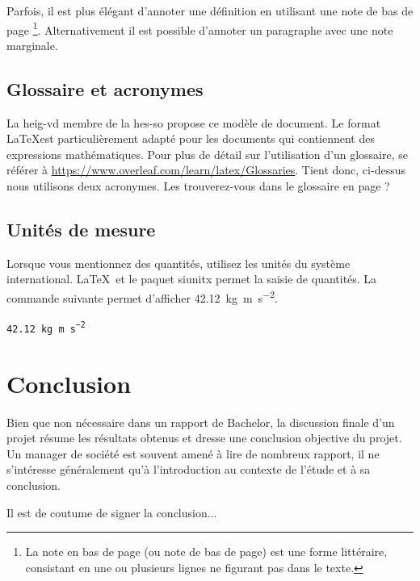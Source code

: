 \documentclass[
    iai, %
    eai, %
]{heig-tb}
\begin{document}
 Parfois, il est plus élégant d'annoter une définition en utilisant une note de bas de page \footnote{La note en bas de page (ou note de bas de page) est une forme littéraire, consistant en une ou plusieurs lignes ne figurant pas dans le texte.}. Alternativement il est possible d'annoter un paragraphe avec une note marginale.

\section{Glossaire et acronymes}

La \Gls{heig-vd} membre de la \Gls{hes-so} propose ce modèle de document. Le format \LaTeX est particulièrement adapté pour les documents qui contiennent des expressions mathématiques. Pour plus de détail sur l'utilisation d'un glossaire, se référer à \url{https://www.overleaf.com/learn/latex/Glossaries}. Tient donc, ci-dessus nous utilisons deux acronymes. Les trouverez-vous dans le glossaire en page \pageref{glossaire} ?

\section{Unités de mesure}

Lorsque vous mentionnez des quantités, utilisez les unités du système international. \LaTeX~et le paquet \textsf{siunitx} permet la saisie de quantités. La commande suivante permet d'afficher \SI{42.12}{\kilo\gram\metre\per\square\second}.\par

\texttt{\SI{42.12}{\kilo\gram\metre\per\square\second}}\par

\chapter{Conclusion}

Bien que non nécessaire dans un rapport de Bachelor, la discussion finale d'un projet résume les résultats obtenus et dresse une conclusion objective du projet. Un manager de société est souvent amené à lire de nombreux rapport, il ne s'intéresse généralement qu'à l'introduction au contexte de l'étude et à sa conclusion.

Il est de coutume de signer la conclusion...

\vfil
\hspace{8cm}\makeatletter\@author\makeatother\par
\hspace{8cm}\begin{minipage}{5cm}
  \printsignature
\end{minipage}
\clearpage
\end{document}
